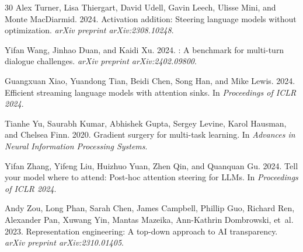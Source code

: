 \documentclass[11pt]{article}
\begin{document}
\begin{thebibliography}{30}
Alex Turner, Lisa Thiergart, David Udell, Gavin Leech, Ulisse Mini, and Monte MacDiarmid. 2024.
\newblock Activation addition: Steering language models without optimization.
\newblock \emph{arXiv preprint arXiv:2308.10248}.

Yifan Wang, Jinhao Duan, and Kaidi Xu. 2024.
: A benchmark for multi-turn dialogue challenges.
\newblock \emph{arXiv preprint arXiv:2402.09800}.

Guangxuan Xiao, Yuandong Tian, Beidi Chen, Song Han, and Mike Lewis. 2024.
\newblock Efficient streaming language models with attention sinks.
\newblock In \emph{Proceedings of ICLR 2024}.

Tianhe Yu, Saurabh Kumar, Abhishek Gupta, Sergey Levine, Karol Hausman, and Chelsea Finn. 2020.
\newblock Gradient surgery for multi-task learning.
\newblock In \emph{Advances in Neural Information Processing Systems}.

Yifan Zhang, Yifeng Liu, Huizhuo Yuan, Zhen Qin, and Quanquan Gu. 2024.
\newblock Tell your model where to attend: Post-hoc attention steering for {LLMs}.
\newblock In \emph{Proceedings of ICLR 2024}.

Andy Zou, Long Phan, Sarah Chen, James Campbell, Phillip Guo, Richard Ren, Alexander Pan, Xuwang Yin, Mantas Mazeika, Ann-Kathrin Dombrowski, et~al. 2023.
\newblock Representation engineering: A top-down approach to {AI} transparency.
\newblock \emph{arXiv preprint arXiv:2310.01405}.

\end{thebibliography}
\end{document}
